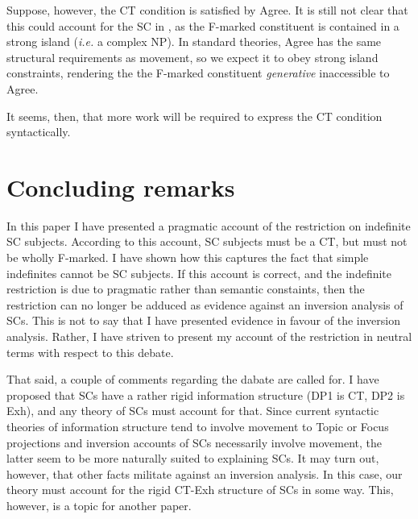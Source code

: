 \documentclass[
	letterpaper,
]{article}
\begin{document}
Suppose, however, the CT condition is satisfied by Agree.
It is still not clear that this could account for the SC in \LLast, as the F-marked constituent is contained in a strong island (\textit{i.e.} a complex NP).
In standard theories, Agree has the same structural requirements as movement, so we expect it to obey strong island constraints, rendering the the F-marked constituent \textit{generative} inaccessible to Agree.

It seems, then, that more work will be required to express the CT condition syntactically.


%
%
\section{Concluding remarks}\label{sec:Conclusion}
In this paper I have presented a pragmatic account of the restriction on indefinite SC subjects.
According to this account, SC subjects must be a CT, but must not be wholly F-marked.
I have shown how this captures the fact that simple indefinites cannot be SC subjects.
If this account is correct, and the indefinite restriction is due to pragmatic rather than semantic constaints, then  the restriction can no longer be adduced as evidence against an inversion analysis of SCs. 
This is not to say that I have presented evidence in favour of the inversion analysis.
Rather, I have striven to present my account of the restriction in neutral terms with respect to this debate.

That said, a couple of comments regarding the dabate are called for.
I have proposed that SCs have a rather rigid information structure (DP1 is CT, DP2 is Exh), and any theory of SCs must account for that.
Since current syntactic theories of information structure tend to involve movement to Topic or Focus projections and inversion accounts of SCs necessarily involve movement, the latter seem to be more naturally suited to explaining SCs.
It may turn out, however, that other facts militate against an inversion analysis.
In this case, our theory must account for the rigid CT-Exh structure of SCs in some way.
This, however, is a topic for another paper.
\end{document}
